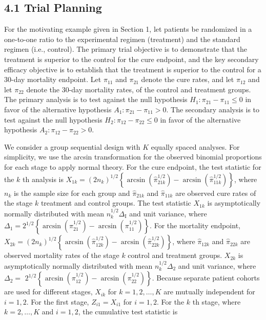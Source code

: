 \documentclass[10pt]{article}
\begin{document}
\subsection*{4.1 Trial Planning}
For the motivating example given in Section 1, let patients be randomized in a one-to-one ratio to the experimental regimen (treatment) and the standard regimen (i.e., control). The primary trial objective is to demonstrate that the treatment is superior to the control for the cure endpoint, and the key secondary efficacy objective is to establish that the treatment is superior to the control for a 30-day mortality endpoint. Let $\pi_{11}$ and $\pi_{21}$ denote the cure rates, and let $\pi_{12}$ and let $\pi_{22}$ denote the 30-day mortality rates, of the control and treatment groups. The primary analysis is to test against the null hypothesis $H_{1}: \pi_{21}-\pi_{11} \leq 0$ in favor of the alternative hypothesis $A_{1}: \pi_{21}-\pi_{11}>0$. The secondary analysis is to test against the null hypothesis $H_{2}: \pi_{12}-\pi_{22} \leq 0$ in favor of the alternative hypothesis $A_{2}: \pi_{12}-\pi_{22}>0$.

We consider a group sequential design with $K$ equally spaced analyses. For simplicity, we use the arcsin transformation for the observed binomial proportions for each stage to apply normal theory. For the cure endpoint, the test statistic for the $k$ th analysis is $X_{1 k}=\left(2 n_{k}\right)^{1 / 2}\left\{\arcsin \left(\hat{\pi}_{21 k}^{1 / 2}\right)-\arcsin \left(\hat{\pi}_{11 k}^{1 / 2}\right)\right\}$, where $n_{k}$ is the sample size for each group and $\hat{\pi}_{21 k}$ and $\hat{\pi}_{11 k}$ are observed cure rates of the stage $k$ treatment and control groups. The test statistic $X_{1 k}$ is asymptotically normally distributed with mean $n_{k}^{1 / 2} \Delta_{\mathrm{I}}$ and unit variance, where $\Delta_{1}=2^{1 / 2}\left\{\arcsin \left(\pi_{21}^{1 / 2}\right)-\arcsin \left(\pi_{11}^{1 / 2}\right)\right\}$. For the mortality endpoint, $X_{2 k}=\left(2 n_{k}\right)^{1 / 2}\left\{\arcsin \left(\hat{\pi}_{12 k}^{1 / 2}\right)-\arcsin \left(\hat{\pi}_{22 k}^{1 / 2}\right)\right\}$, where $\hat{\pi}_{12 k}$ and $\hat{\pi}_{22 k}$ are observed mortality rates of the stage $k$ control and treatment groups. $X_{2 k}$ is asymptotically normally distributed with mean $n_{k}^{1 / 2} \Delta_{2}$ and unit variance, where $\Delta_{2}=$ $2^{1 / 2}\left\{\arcsin \left(\pi_{12}^{1 / 2}\right)-\arcsin \left(\pi_{22}^{1 / 2}\right)\right\}$. Because separate patient cohorts are used for different stages, $X_{i k}$ for $k=1,2, \ldots, K$ are mutually independent for $i=1,2$. For the first stage, $Z_{i 1}=X_{i 1}$ for $i=1,2$. For the $k$ th stage, where $k=2, \ldots, K$ and $i=1,2$, the cumulative test statistic is
\end{document}
